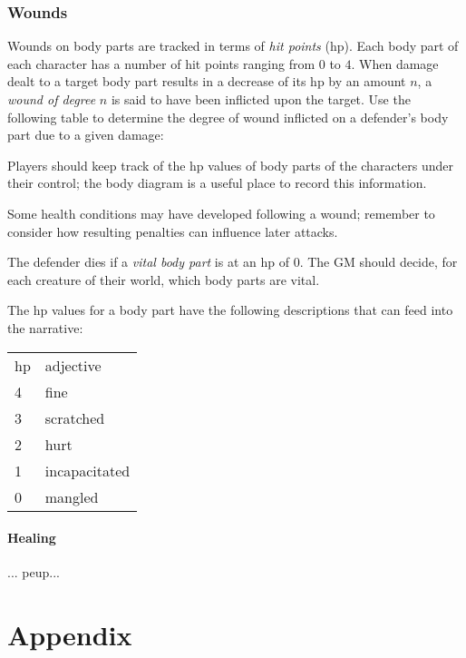 \documentclass[12pt]{article}
\newcommand{\notes}[1]{{\color{Tan} #1}}
\newcommand{\emdex}[1]{\emph{#1}\index{#1}}
\begin{document}
\subsubsection{Wounds}\label{sec:wounds}

Wounds on body parts are tracked in terms of \emdex{hit points} (hp).
Each body part of each character has a number of hit points ranging from
$0$ to $4$.
When damage dealt to a target body part results in a decrease of its hp by an amount $n$, 
a \emph{wound of degree}
$n$ is said to have been inflicted upon the target.
Use the following table to determine the degree of wound inflicted on a defender's body part
due to a given damage:
\begin{center}

\end{center}
Players should keep track of the hp values of body parts of the characters under their control;
the body diagram is a useful place to record this information.

Some health conditions may have developed following a wound;
remember to consider how resulting penalties can influence later attacks.

The defender dies if a \emdex{vital body part} is at an hp of $0$.
The GM should decide, for each creature of their world, which body parts are vital.

The hp values for a body part have the following descriptions that can feed into the narrative:
\begin{center}
{\setlength{\extrarowheight}{1pt}
\begin{tabular}{l|l}
hp & adjective \\
\cline{1-2}
4  & fine \\
3  & scratched \\
2  & hurt \\
1  & incapacitated \\
0  & mangled
\end{tabular}}
\end{center}

\paragraph{Healing} ...\notes{peup}...


\section{Appendix}
\end{document}
